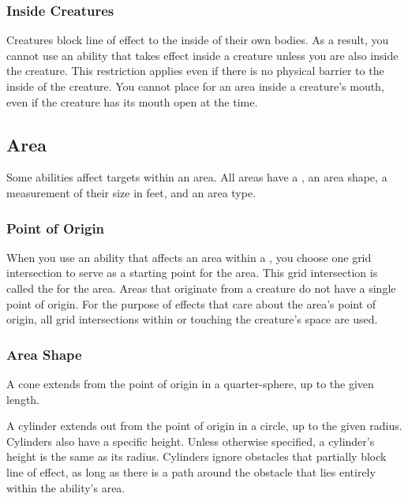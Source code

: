         \subsubsection{Inside Creatures}
            Creatures block line of effect to the inside of their own bodies.
            As a result, you cannot use an ability that takes effect inside a creature unless you are also inside the creature.
            This restriction applies even if there is no physical barrier to the inside of the creature.
            You cannot place  for an area inside a creature's mouth, even if the creature has its mouth open at the time.

    \subsection{Area}\label{Area}

        Some abilities affect targets within an area.
        All areas have a , an area shape, a measurement of their size in feet, and an area type.

        \subsubsection{Point of Origin}\label{Point of Origin}
            When you use an ability that affects an area within a , you choose one grid intersection to serve as a starting point for the area.
            This grid intersection is called the  for the area.
            Areas that originate from a creature do not have a single point of origin.
            For the purpose of effects that care about the area's point of origin, all grid intersections within or touching the creature's space are used.

        \subsubsection{Area Shape}

             A cone extends from the point of origin in a quarter-sphere, up to the given length.

             A cylinder extends out from the point of origin in a circle, up to the given radius.
            Cylinders also have a specific height.
            Unless otherwise specified, a cylinder's height is the same as its radius.
            Cylinders ignore obstacles that partially block line of effect, as long as there is a path around the obstacle that lies entirely within the ability's area.

